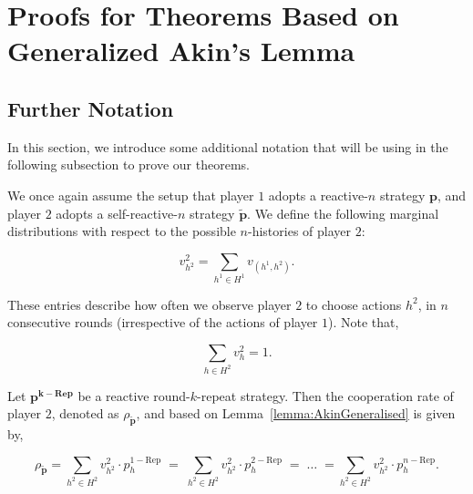 \documentclass{article}
\theoremstyle{definition}
\begin{document}

\section{Proofs for Theorems Based on Generalized Akin's Lemma}\label{appendix:proofs_for_theorems_generalized_akin}


\subsection{Further Notation}

In this section, we introduce some additional notation that will be using in the
following subsection to prove our theorems.

We once again assume the setup that player $1$ adopts a reactive-$n$ strategy
$\mathbf{p}$, and player $2$ adopts a self-reactive-$n$ strategy
$\mathbf{\tilde{p}}$. We define the following marginal distributions with
respect to the possible $n$-histories of player $2$:

\begin{equation}\label{Eq:marginal_distributions}
\displaystyle v^2_{h^2} = \sum_{h^1\in H^1} v_{(h^1, h^2)}.
\end{equation}

These entries describe how often we observe player $2$ to choose actions $h^2$,
in $n$ consecutive rounds (irrespective of the actions of player $1$). Note
that,

\begin{equation}\label{eq:normalization_marginal_distributions}
  \displaystyle \sum_{h \in H^2} v^2_{h} = 1.
\end{equation}

Let $\mathbf{p^{k - \text{Rep}}}$ be a reactive round-$k$-repeat strategy. Then
the cooperation rate of player $2$, denoted as $\rho_\mathbf{\tilde{p}}$, and based
on Lemma~\ref{lemma:AkinGeneralised} is given by,

\begin{equation}\label{Eq:coplayer_cooperation_expr}
  \rho_\mathbf{\tilde{p}} = \sum_{h^2 \in H^{2}} v^{2}_{h^2} \cdot p^{1 - \text{Rep}}_{h} \; = \; \sum_{h^2 \in H^{2}} v^{2}_{h^2} \cdot p^{2 - \text{Rep}}_{h} \; = \; \dots \; = \sum_{h^2 \in H^{2}} v^{2}_{h^2} \cdot p^{n - \text{Rep}}_{h}.
\end{equation}
\end{document}
